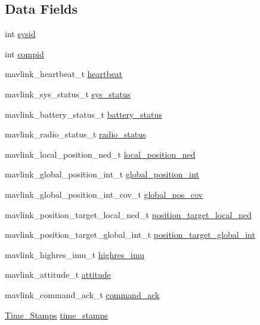 \subsection*{Data Fields}
\begin{DoxyCompactItemize}
\item 
int \hyperlink{struct_mavlink___messages_a7a9e72f297c762c6d1b36c4c1f83a7ec}{sysid}
\item 
int \hyperlink{struct_mavlink___messages_af0d634d7b4bfadf921b2e991039d38a6}{compid}
\item 
mavlink\+\_\+heartbeat\+\_\+t \hyperlink{struct_mavlink___messages_a7ae2affcf7148de15c05eebf74909e58}{heartbeat}
\item 
mavlink\+\_\+sys\+\_\+status\+\_\+t \hyperlink{struct_mavlink___messages_ae30043ef99cf3612838c79efec1baf8d}{sys\+\_\+status}
\item 
mavlink\+\_\+battery\+\_\+status\+\_\+t \hyperlink{struct_mavlink___messages_a1d01753b58f387b8cc6d59391569dda5}{battery\+\_\+status}
\item 
mavlink\+\_\+radio\+\_\+status\+\_\+t \hyperlink{struct_mavlink___messages_a7aa8a2cdcbccb7f5696ce796e7db2194}{radio\+\_\+status}
\item 
mavlink\+\_\+local\+\_\+position\+\_\+ned\+\_\+t \hyperlink{struct_mavlink___messages_acf461f86d07049bd708dd4ac360f6da3}{local\+\_\+position\+\_\+ned}
\item 
mavlink\+\_\+global\+\_\+position\+\_\+int\+\_\+t \hyperlink{struct_mavlink___messages_a6d6095b510c6396262d76cfae41dea27}{global\+\_\+position\+\_\+int}
\item 
mavlink\+\_\+global\+\_\+position\+\_\+int\+\_\+cov\+\_\+t \hyperlink{struct_mavlink___messages_adbf6f8ee1679c7b1b6e587d437508f40}{global\+\_\+pos\+\_\+cov}
\item 
mavlink\+\_\+position\+\_\+target\+\_\+local\+\_\+ned\+\_\+t \hyperlink{struct_mavlink___messages_a1b80bbd13b6a7f75c436b16366a9bcf3}{position\+\_\+target\+\_\+local\+\_\+ned}
\item 
mavlink\+\_\+position\+\_\+target\+\_\+global\+\_\+int\+\_\+t \hyperlink{struct_mavlink___messages_ab87a0a7af2333a7fe491bbb3f44dfb29}{position\+\_\+target\+\_\+global\+\_\+int}
\item 
mavlink\+\_\+highres\+\_\+imu\+\_\+t \hyperlink{struct_mavlink___messages_afa03c0593ea0c41e2835bc771bbc7376}{highres\+\_\+imu}
\item 
mavlink\+\_\+attitude\+\_\+t \hyperlink{struct_mavlink___messages_a47b4f113f51db6752e7a800d10afffa3}{attitude}
\item 
mavlink\+\_\+command\+\_\+ack\+\_\+t \hyperlink{struct_mavlink___messages_a3ef05502567cfd552330d9ede9a89552}{command\+\_\+ack}
\item 
\hyperlink{struct_time___stamps}{Time\+\_\+\+Stamps} \hyperlink{struct_mavlink___messages_aaa9e25fa47c4a823e4d15ce2798286f1}{time\+\_\+stamps}
\end{DoxyCompactItemize}


